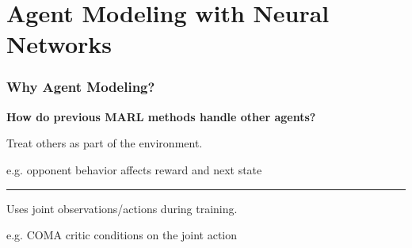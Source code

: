 \section{Agent Modeling with Neural Networks}

\begin{frame}
\frametitle{Why Agent Modeling?}

\centering
{\large\textbf{How do previous MARL methods handle other agents?}}

\vspace{0.75em}

\noindent
\begin{minipage}[c][1.10cm][c]{0.20\textwidth}
    \centering
\end{minipage}\hfill
\begin{minipage}[c][1.10cm][c]{0.39\textwidth}
    \centering
    \small Treat others as part of the environment.
\end{minipage}\hfill
\begin{minipage}[c][1.10cm][c]{0.34\textwidth}
    \raggedright
    {\footnotesize\color{black!55} \textrm{e.g.} opponent behavior affects reward and next state}
\end{minipage}

\vspace{0.25em}
\color{gray!30}\rule{\textwidth}{0.4pt}
\color{black}\vspace{0.25em}

\noindent
\begin{minipage}[c][1.10cm][c]{0.20\textwidth}
    \centering
\end{minipage}\hfill
\begin{minipage}[c][1.10cm][c]{0.39\textwidth}
    \centering
    \small Uses joint observations/actions during training.
\end{minipage}\hfill
\begin{minipage}[c][1.10cm][c]{0.34\textwidth}
    \raggedright
    {\footnotesize\color{black!55} \textrm{e.g.} COMA critic conditions on the joint action}
\end{minipage}


\end{frame}
